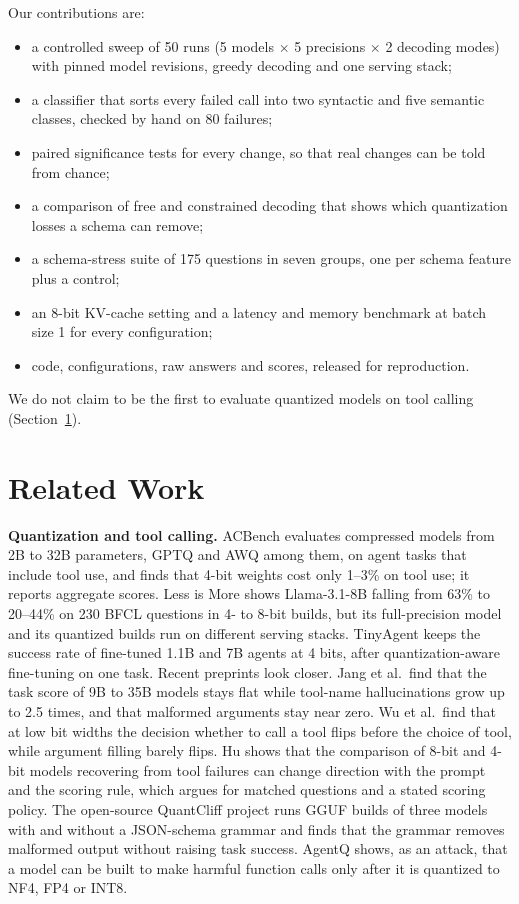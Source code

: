 \documentclass[conference]{IEEEtran}
\begin{document}
Our contributions are:
\begin{itemize}
  \item a controlled sweep of 50 runs (5 models $\times$ 5 precisions $\times$ 2 decoding modes) with pinned model
        revisions, greedy decoding and one serving stack;
  \item a classifier that sorts every failed call into two syntactic and five semantic classes, checked by hand on
        80 failures;
  \item paired significance tests for every change, so that real changes can be told from chance;
  \item a comparison of free and constrained decoding that shows which quantization losses a schema can remove;
  \item a schema-stress suite of 175 questions in seven groups, one per schema feature plus a control;
  \item an 8-bit KV-cache setting and a latency and memory benchmark at batch size 1 for every configuration;
  \item code, configurations, raw answers and scores, released for reproduction.
\end{itemize}
We do not claim to be the first to evaluate quantized models on tool calling (Section~\ref{sec:related}).

\section{Related Work}\label{sec:related}
\textbf{Quantization and tool calling.} ACBench evaluates compressed models from 2B to 32B parameters, GPTQ and AWQ
among them, on agent tasks that include tool use, and finds that 4-bit weights cost only 1--3\% on tool use; it
reports aggregate scores. Less is More shows Llama-3.1-8B falling from 63\% to 20--44\% on 230 BFCL questions in 4-
to 8-bit builds, but its full-precision model and its quantized builds run on different serving stacks. TinyAgent
keeps the success rate of fine-tuned 1.1B and 7B agents at 4 bits, after quantization-aware fine-tuning on one task.
Recent preprints look closer. Jang et al.\ find that the task score of 9B to 35B models stays flat while tool-name
hallucinations grow up to 2.5 times, and that malformed arguments stay near zero. Wu et al.\ find that at low bit
widths the decision whether to call a tool flips before the choice of tool, while argument filling barely flips.
Hu shows that the comparison of 8-bit and 4-bit models recovering from tool failures can change direction with the
prompt and the scoring rule, which argues for matched questions and a stated scoring policy. The open-source
QuantCliff project runs GGUF builds of three models with and without a JSON-schema grammar and finds that the grammar
removes malformed output without raising task success. AgentQ shows, as an attack, that a model can be built to make
harmful function calls only after it is quantized to NF4, FP4 or INT8.
\end{document}
